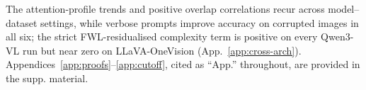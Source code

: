 \documentclass[10pt,twocolumn,letterpaper]{article}
\newcommand{\Wt}{W_t(\omega)}
\newcommand{\DF}{\Delta F(\omega)}
\begin{document}

% 
The attention-profile trends and positive overlap correlations recur across model--dataset settings, while verbose prompts improve accuracy on corrupted images in all six; the strict FWL-residualised complexity term is positive on every Qwen3-VL run but near zero on LLaVA-OneVision (App.~\ref{app:cross-arch}).
Appendices~\ref{app:proofs}--\ref{app:cutoff}, cited as ``App.'' throughout, are provided in the supp. material.
% 
\end{document}

